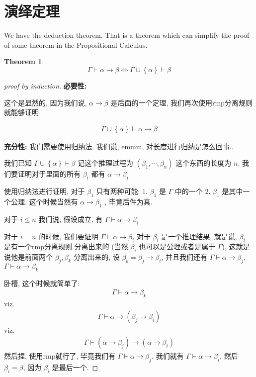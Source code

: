 \documentclass[12pt, a4paper]{ctexart} %
\title{}
\theoremstyle{plain}
\newtheorem{theorem}{Theorem}[section]
\theoremstyle{definition}
\begin{document}
\section{演绎定理}
We have the deduction theorem. That is a theorem which can 
simplify the proof of some theorem in the Propositional 
Calculus. 

\begin{theorem}
    \begin{equation}
        \Gamma \vdash \alpha \to \beta \iff \Gamma \cup \left\{\alpha   \right\} \vdash \beta
    \end{equation}
\end{theorem}
\begin{proof}[proof by induction]
    {\bfseries 必要性:}

     这个是显然的, 因为我们说, $\alpha \to \beta$ 是后面的一个定理, 
     我们再次使用rmp分离规则就能够证明

     \begin{align*}
        \Gamma \cup \left\{\alpha   \right\} \vdash \alpha\to\beta
     \end{align*}

     {\bfseries 充分性:}
     我们需要使用归纳法. 我们说, 
     emmm, 对长度进行归纳是怎么回事..

     我们已知 $\Gamma \cup \left\{\alpha    \right\} \vdash \beta $ 
     记这个推理过程为 $\left( \beta _{1} , \cdots  , \beta _{n}\right)$ 这个东西的长度为 $n$.
     我们要证明对于里面的所有 $\beta _{i}$ 都有 $\alpha \to \beta_{i}$

     使用归纳法进行证明, 对于 $\beta _{1}$ 只有两种可能: 1. $\beta_{1}$ 是 $\Gamma$ 中的一个 2. $\beta_{1}$ 是其中一个公理.
     这个时候当然有 $\alpha \to \beta_{1}$ , 毕竟后件为真. 

     对于 $i \le n$ 我们说, 假设成立, 有 $\Gamma \vdash \alpha \to \beta _{i}$ 

     对于 $i  = n$ 的时候, 我们要证明 $\Gamma \vdash  \alpha \to \beta_{i}$
     对于 $\beta _{i}$ 是一个推理结果, 就是说, $\beta_{i}$ 是有一个rmp分离规则
     分离出来的 (当然 $\beta_{i}$ 也可以是公理或者是属于 $\Gamma$), 这就是说他是前面两个 $\beta_{j} , \beta_{k}$ 分离出来的, 设 $\beta_{k} = \beta_{j} \to \beta_{i}$, 并且我们还有 
     $\Gamma \vdash  \alpha \to \beta_{j}$, $\Gamma \vdash  \alpha \to \beta_{k}$

     卧槽, 这个时候就简单了: 
     \begin{align*}
        \Gamma \vdash \alpha \to \beta_{k} 
     \end{align*}
     viz.
     \begin{align*}
        \Gamma \vdash \alpha \to \left( \beta_{j} \to \beta_{i}\right) 
     \end{align*}
     viz. 
     \begin{align*}
        \Gamma \vdash  \left( \alpha \to \beta_{j} \right) \to \left( \alpha \to \beta_{i}\right)
     \end{align*}
     然后捏, 使用rmp就行了, 毕竟我们有 $\Gamma \vdash \alpha \to \beta_{j}$. 我们就有 $\Gamma \vdash \alpha \to \beta_{i}$, 
     然后 $\beta_{i} = \beta$, 因为 $\beta_{i}$ 是最后一个. 
\end{proof}
\end{document}

